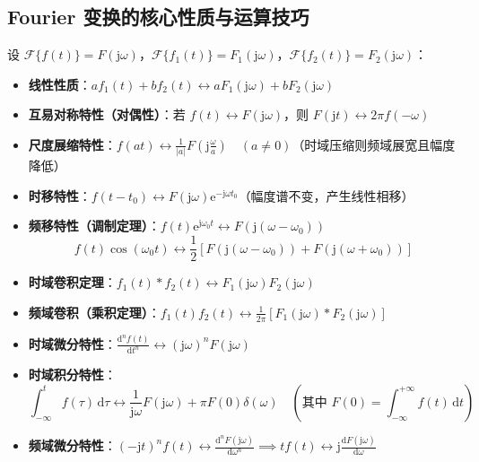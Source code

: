 \documentclass[11pt,a4paper,fontset=fandol]{ctexart}
\theoremstyle{remark}
\begin{document}
\subsection{Fourier 变换的核心性质与运算技巧}

设 $\mathcal{F}\{f(t)\} = F(\mathrm{j}\omega)$，$\mathcal{F}\{f_1(t)\} = F_1(\mathrm{j}\omega)$，$\mathcal{F}\{f_2(t)\} = F_2(\mathrm{j}\omega)$：
\begin{itemize}
    \item \textbf{线性性质}：$a f_1(t) + b f_2(t) \longleftrightarrow a F_1(\mathrm{j}\omega) + b F_2(\mathrm{j}\omega)$
    \item \textbf{互易对称特性（对偶性）}：若 $f(t) \longleftrightarrow F(\mathrm{j}\omega)$，则 $F(\mathrm{j}t) \longleftrightarrow 2\pi f(-\omega)$
    \item \textbf{尺度展缩特性}：$f(at) \longleftrightarrow \frac{1}{|a|} F\left(\mathrm{j}\frac{\omega}{a}\right) \quad (a \neq 0)$（时域压缩则频域展宽且幅度降低）
    \item \textbf{时移特性}：$f(t - t_0) \longleftrightarrow F(\mathrm{j}\omega)\mathrm{e}^{-\mathrm{j}\omega t_0}$（幅度谱不变，产生线性相移）
    \item \textbf{频移特性（调制定理）}：$f(t)\mathrm{e}^{\mathrm{j}\omega_0 t} \longleftrightarrow F(\mathrm{j}(\omega - \omega_0))$
    \begin{equation}
        f(t)\cos(\omega_0 t) \longleftrightarrow \frac{1}{2}[F(\mathrm{j}(\omega - \omega_0)) + F(\mathrm{j}(\omega + \omega_0))]
    \end{equation}
    \item \textbf{时域卷积定理}：$f_1(t) * f_2(t) \longleftrightarrow F_1(\mathrm{j}\omega) F_2(\mathrm{j}\omega)$
    \item \textbf{频域卷积（乘积定理）}：$f_1(t) f_2(t) \longleftrightarrow \frac{1}{2\pi} [F_1(\mathrm{j}\omega) * F_2(\mathrm{j}\omega)]$
    \item \textbf{时域微分特性}：$\frac{\mathrm{d}^n f(t)}{\mathrm{d}t^n} \longleftrightarrow (\mathrm{j}\omega)^n F(\mathrm{j}\omega)$
    \item \textbf{时域积分特性}：
    \begin{equation}
        \int_{-\infty}^t f(\tau)\,\mathrm{d}\tau \longleftrightarrow \frac{1}{\mathrm{j}\omega}F(\mathrm{j}\omega) + \pi F(0)\delta(\omega) \quad \left(\text{其中 } F(0) = \int_{-\infty}^{+\infty} f(t)\,\mathrm{d}t\right)
    \end{equation}
    \item \textbf{频域微分特性}：$(- \mathrm{j}t)^n f(t) \longleftrightarrow \frac{\mathrm{d}^n F(\mathrm{j}\omega)}{\mathrm{d}\omega^n} \implies t f(t) \longleftrightarrow \mathrm{j}\frac{\mathrm{d}F(\mathrm{j}\omega)}{\mathrm{d}\omega}$
\end{itemize}
\end{document}

